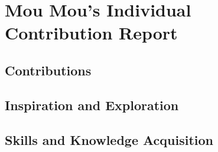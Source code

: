 \chapter*{Mou Mou's Individual Contribution Report}

\blindtext

\section*{Contributions}

\blindtext

\section*{Inspiration and Exploration}

\blindtext

\section*{Skills and Knowledge Acquisition}

\blindtext